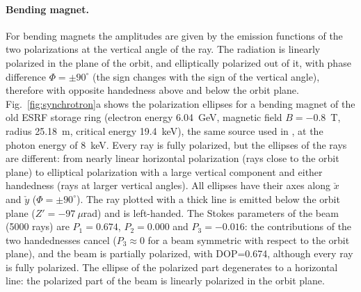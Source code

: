 \documentclass{iucr}
\begin{document}
\paragraph{Bending magnet.}
For bending magnets \cite{SanchezdelRio2024bm} the amplitudes are given by the emission functions of the two polarizations at the vertical angle of the ray. The radiation is linearly polarized in the plane of the orbit, and elliptically polarized out of it, with phase difference $\Phi=\pm 90^\circ$ (the sign changes with the sign of the vertical angle), therefore with opposite handedness above and below the orbit plane.
Fig.~\ref{fig:synchrotron}a shows the polarization ellipses for a bending magnet of the old ESRF storage ring (electron energy 6.04~GeV, magnetic field $B=-0.8$~T, radius 25.18~m, critical energy 19.4~keV), the same source used in \cite{SanchezdelRio2024bm}, at the photon energy of 8~keV. Every ray is fully polarized, but the ellipses of the rays are different: from nearly linear horizontal polarization (rays close to the orbit plane) to elliptical polarization with a large vertical component and either handedness (rays at larger vertical angles). All ellipses have their axes along $\check{x}$ and $\check{y}$ ($\Phi=\pm90^\circ$). The ray plotted with a thick line is emitted below the orbit plane ($Z'=-97~\mu$rad) and is left-handed.
The Stokes parameters of the beam (5000 rays) are $P_1=0.674$, $P_2=0.000$ and $P_3=-0.016$: the contributions of the two handednesses cancel ($P_3\approx 0$ for a beam symmetric with respect to the orbit plane), and the beam is partially polarized, with DOP=0.674, although every ray is fully polarized. The ellipse of the polarized part degenerates to a horizontal line: the polarized part of the beam is linearly polarized in the orbit plane.
\end{document}
